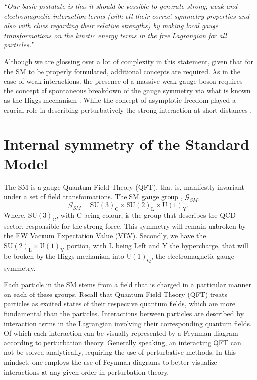 \documentclass[10pt]{book}
\newcommand{\U}[1]{\mathrm{U}(1)_{\mathrm{#1}}}
\newcommand{\SU}[1]{\mathrm{SU}(2)_{\mathrm{#1}}}
\renewcommand{\(}{\left(}
\renewcommand{\)}{\right)}
\renewcommand{\[}{\left[}
\renewcommand{\]}{\right]}
\begin{document}
\textit{“Our basic postulate is that it should be possible to generate strong,  weak and electromagnetic  interaction terms (with all their correct symmetry properties and also with clues regarding their relative strengths) by making local gauge transformations on the kinetic energy terms in the free Lagrangian for all particles.”} %

Although we are glossing over a lot of complexity in this statement, given that for the SM to be properly formulated, additional concepts are required. 
%
As in the case of weak interactions, the presence of a massive weak gauge boson requires the concept of spontaneous breakdown of the gauge symmetry via what is known as the Higgs mechanism \cite{higgs1964broken}. 
%
While the concept of asymptotic freedom played a crucial role in describing perturbatively the strong interaction at short distances \cite{politzer1973reliable}.  

\section{Internal symmetry of the Standard Model}
%
The SM is a gauge Quantum Field Theory (QFT), that is, manifestly invariant under a set of field transformations. The SM gauge group \cite{Quigg:1983gw}, $\mathcal{G}_{SM}$,%
%
%
\begin{equation}
\mathcal{G}_{SM} = \mathrm{SU}(3)_{\mathrm{C}} \times \SU{L} \times \U{Y}   .
\label{eq:SM_Group}
\end{equation} 
%
Where, $\mathrm{SU}(3)_{\mathrm{C}}$, with $\mathrm{C}$ being colour, is the group that describes the QCD sector, responsible for the strong force. This symmetry will remain unbroken by the EW Vacuum Expectation Value (VEV).
%
Secondly, we have the $\SU{L} \times \U{Y}$ portion, with L being Left and Y the hypercharge, that will be broken by the Higgs mechanism into $\U{Q}$, the electromagnetic gauge symmetry.

Each particle in the SM stems from a field that is charged in a particular manner on each of these groups.  
%
Recall that Quantum Field Theory (QFT) treats particles as excited states of their respective quantum fields, which are more fundamental than the particles. 
%
Interactions between particles are described by interaction terms in the Lagrangian involving their corresponding quantum fields.
%
Of which each interaction can be visually represented by a Feynman diagram according to perturbation theory.
%
Generally speaking, an interacting QFT can not be solved analytically, requiring the use of perturbative methods. 
%
In this mindset, one employs the use of Feynman diagrams to better visualize interactions at any given order in perturbation theory.
\end{document}
